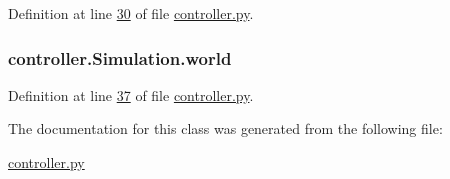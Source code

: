 Definition at line \hyperlink{controller_8py_source_l00030}{30} of file \hyperlink{controller_8py_source}{controller.\+py}.

\hypertarget{classcontroller_1_1Simulation_a2ba0c3cf1949a98dd920f6097953c1f5}{
\subsubsection[{world}]{\setlength{\rightskip}{0pt plus 5cm}controller.\+Simulation.\+world}}\label{classcontroller_1_1Simulation_a2ba0c3cf1949a98dd920f6097953c1f5}


Definition at line \hyperlink{controller_8py_source_l00037}{37} of file \hyperlink{controller_8py_source}{controller.\+py}.



The documentation for this class was generated from the following file\+:\begin{DoxyCompactItemize}
\item 
\hyperlink{controller_8py}{controller.\+py}\end{DoxyCompactItemize}
